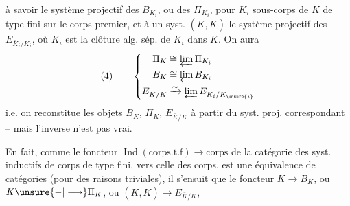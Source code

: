 à savoir le système projectif des $B_{K_i}$, ou des $\Pi_{K_i}$, pour $K_i$ sous-corps de $K$ de type fini sur le corps premier, et à un syst. $(K,\bar K)$ le système projectif des $E_{\bar K_i/K_i}$, où $\bar K_i$ est la clôture alg. sép. de $K_i$ dans $\bar K$. On aura
\[
(4)\qquad\left\{\begin{aligned}
\Pi_K&\cong\varprojlim\Pi_{K_i}\\
B_K&\cong\varprojlim B_{K_i}\\
E_{\bar K/K}&\xrightarrow{\sim}\varprojlim E_{\bar K_i/K_{\unsure{i}}}
\end{aligned}\right.
\]
i.e. on reconstitue les objets $B_K$, $\Pi_K$, $E_{\bar K/K}$ à partir du syst. proj. correspondant -- mais l'inverse n'est pas vrai.

En fait, comme le foncteur $\operatorname{Ind}(\text{corps.t.f})\longrightarrow\text{corps}$ de la catégorie des syst. inductifs de corps de type fini, vers celle des corps, est une équivalence de catégories (pour des raisons triviales), il s'ensuit que le foncteur $K\longrightarrow B_K$, ou $K\unsure{-|\longrightarrow}\Pi_K$, ou $(K,\bar K)\longrightarrow E_{\bar K/K}$, 
